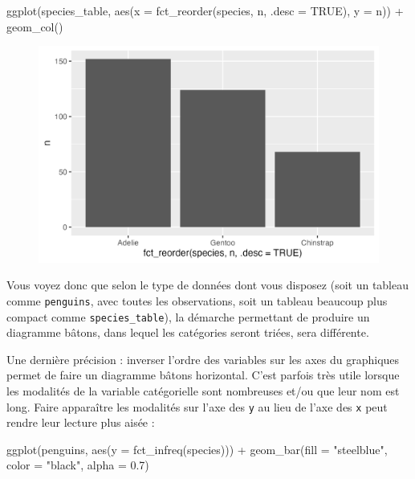 \documentclass[
  letterpaper,
  DIV=11,
  numbers=noendperiod]{scrreprt}
\newenvironment{Shaded}{\begin{snugshade}}{\end{snugshade}}
\newcommand{\AttributeTok}[1]{\textcolor[rgb]{0.40,0.45,0.13}{#1}}
\newcommand{\ConstantTok}[1]{\textcolor[rgb]{0.56,0.35,0.01}{#1}}
\newcommand{\FloatTok}[1]{\textcolor[rgb]{0.68,0.00,0.00}{#1}}
\newcommand{\FunctionTok}[1]{\textcolor[rgb]{0.28,0.35,0.67}{#1}}
\newcommand{\NormalTok}[1]{\textcolor[rgb]{0.00,0.23,0.31}{#1}}
\newcommand{\SpecialCharTok}[1]{\textcolor[rgb]{0.37,0.37,0.37}{#1}}
\newcommand{\StringTok}[1]{\textcolor[rgb]{0.13,0.47,0.30}{#1}}
\begin{document}
\begin{Shaded}
\begin{Highlighting}[]
\FunctionTok{ggplot}\NormalTok{(species\_table, }
       \FunctionTok{aes}\NormalTok{(}\AttributeTok{x =} \FunctionTok{fct\_reorder}\NormalTok{(species, n, }\AttributeTok{.desc =} \ConstantTok{TRUE}\NormalTok{), }\AttributeTok{y =}\NormalTok{ n)) }\SpecialCharTok{+}
  \FunctionTok{geom\_col}\NormalTok{()}
\end{Highlighting}
\end{Shaded}

\begin{figure}[H]

{\centering \includegraphics{./03-visualization_files/figure-pdf/unnamed-chunk-43-1.png}

}

\end{figure}

Vous voyez donc que selon le type de données dont vous disposez (soit un
tableau comme \texttt{penguins}, avec toutes les observations, soit un
tableau beaucoup plus compact comme \texttt{species\_table}), la
démarche permettant de produire un diagramme bâtons, dans lequel les
catégories seront triées, sera différente.

Une dernière précision : inverser l'ordre des variables sur les axes du
graphiques permet de faire un diagramme bâtons horizontal. C'est parfois
très utile lorsque les modalités de la variable catégorielle sont
nombreuses et/ou que leur nom est long. Faire apparaître les modalités
sur l'axe des \texttt{y} au lieu de l'axe des \texttt{x} peut rendre
leur lecture plus aisée :

\begin{Shaded}
\begin{Highlighting}[]
\FunctionTok{ggplot}\NormalTok{(penguins, }\FunctionTok{aes}\NormalTok{(}\AttributeTok{y =} \FunctionTok{fct\_infreq}\NormalTok{(species))) }\SpecialCharTok{+}
  \FunctionTok{geom\_bar}\NormalTok{(}\AttributeTok{fill =} \StringTok{"steelblue"}\NormalTok{, }\AttributeTok{color =} \StringTok{"black"}\NormalTok{, }\AttributeTok{alpha =} \FloatTok{0.7}\NormalTok{)}
\end{Highlighting}
\end{Shaded}
\end{document}
